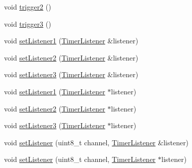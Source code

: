 \begin{DoxyCompactItemize}
\item 
void \hyperlink{classmhvlib_1_1_timer_af2afb0f63cf9d4d24abda526164fdc6e}{trigger2} ()
\item 
void \hyperlink{classmhvlib_1_1_timer_a08d18757ee0ae08d77987e9a9dc72f4a}{trigger3} ()
\item 
void \hyperlink{classmhvlib_1_1_timer_a5ea96b8e59d3627b2c994a677876a04a}{set\-Listener1} (\hyperlink{classmhvlib_1_1_timer_listener}{Timer\-Listener} \&listener)
\item 
void \hyperlink{classmhvlib_1_1_timer_a55080debc04f1480b192689974807786}{set\-Listener2} (\hyperlink{classmhvlib_1_1_timer_listener}{Timer\-Listener} \&listener)
\item 
void \hyperlink{classmhvlib_1_1_timer_a43fb14f7c8d5f7e0c9d828523590d656}{set\-Listener3} (\hyperlink{classmhvlib_1_1_timer_listener}{Timer\-Listener} \&listener)
\item 
void \hyperlink{classmhvlib_1_1_timer_a378aa8973c1523960cdf5750469dfe5f}{set\-Listener1} (\hyperlink{classmhvlib_1_1_timer_listener}{Timer\-Listener} $\ast$listener)
\item 
void \hyperlink{classmhvlib_1_1_timer_a8c897471191466b23800427bb131db14}{set\-Listener2} (\hyperlink{classmhvlib_1_1_timer_listener}{Timer\-Listener} $\ast$listener)
\item 
void \hyperlink{classmhvlib_1_1_timer_a571e3df81fadec4102797cbd9c40c414}{set\-Listener3} (\hyperlink{classmhvlib_1_1_timer_listener}{Timer\-Listener} $\ast$listener)
\item 
void \hyperlink{classmhvlib_1_1_timer_afaa4108a779cbdddd114e5a55530617a}{set\-Listener} (uint8\-\_\-t channel, \hyperlink{classmhvlib_1_1_timer_listener}{Timer\-Listener} \&listener)
\item 
void \hyperlink{classmhvlib_1_1_timer_a20f30a67ca1a78bd8cbe4e49765471e4}{set\-Listener} (uint8\-\_\-t channel, \hyperlink{classmhvlib_1_1_timer_listener}{Timer\-Listener} $\ast$listener)
\end{DoxyCompactItemize}

